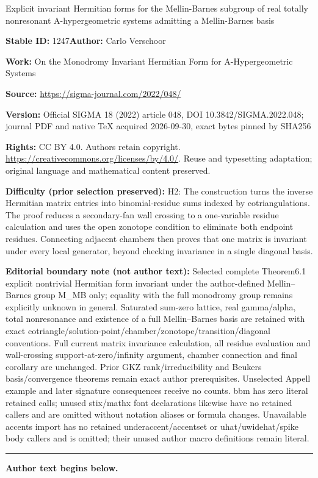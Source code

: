 \documentclass[11pt]{article}
\numberwithin{equation}{section}
\numberwithin{equation}{section}
\begin{document}
\begin{center}\Large Explicit invariant Hermitian forms for the Mellin-Barnes subgroup of real totally nonresonant A-hypergeometric systems admitting a Mellin-Barnes basis\end{center}
\noindent\textbf{Stable ID:} 1247\quad\textbf{Author:} Carlo Verschoor\par
\noindent\textbf{Work:} On the Monodromy Invariant Hermitian Form for A-Hypergeometric Systems\par
\noindent\textbf{Source:} \url{https://sigma-journal.com/2022/048/}\par
\noindent\textbf{Version:} Official SIGMA 18 (2022) article 048, DOI 10.3842/SIGMA.2022.048; journal PDF and native TeX acquired 2026-09-30, exact bytes pinned by SHA256\par
\noindent\textbf{Rights:} CC BY 4.0. Authors retain copyright. \url{https://creativecommons.org/licenses/by/4.0/}. Reuse and typesetting adaptation; original language and mathematical content preserved.\par
\noindent\textbf{Difficulty (prior selection preserved):} {\CJKfont H2: The construction turns the inverse Hermitian matrix entries into binomial-residue sums indexed by cotriangulations. The proof reduces a secondary-fan wall crossing to a one-variable residue calculation and uses the open zonotope condition to eliminate both endpoint residues. Connecting adjacent chambers then proves that one matrix is invariant under every local generator, beyond checking invariance in a single diagonal basis.}\par
\medskip\noindent\textbf{Editorial boundary note (not author text):} Selected complete Theorem6.1 explicit nontrivial Hermitian form invariant under the author-defined Mellin–Barnes group M\_MB only; equality with the full monodromy group remains explicitly unknown in general. Saturated sum-zero lattice, real gamma/alpha, total nonresonance and existence of a full Mellin–Barnes basis are retained with exact cotriangle/solution-point/chamber/zonotope/transition/diagonal conventions. Full current matrix invariance calculation, all residue evaluation and wall-crossing support-at-zero/infinity argument, chamber connection and final corollary are unchanged. Prior GKZ rank/irreducibility and Beukers basis/convergence theorems remain exact author prerequisites. Unselected Appell example and later signature consequences receive no counts. bbm has zero literal retained calls; unused stix/mathx font declarations likewise have no retained callers and are omitted without notation aliases or formula changes. Unavailable accents import has no retained underaccent/accentset or uhat/uwidehat/spike body callers and is omitted; their unused author macro definitions remain literal.\par
\medskip\hrule\medskip\noindent\textbf{Author text begins below.}\par
\end{document}

